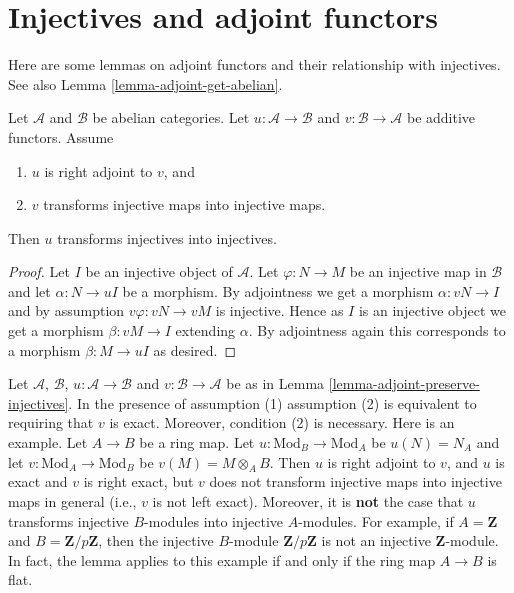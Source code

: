 \section{Injectives and adjoint functors}
\label{section-adjoint}

\noindent
Here are some lemmas on adjoint functors and their relationship with
injectives. See also Lemma \ref{lemma-adjoint-get-abelian}.

\begin{lemma}
\label{lemma-adjoint-preserve-injectives}
Let $\mathcal{A}$ and $\mathcal{B}$ be abelian categories.
Let $u : \mathcal{A} \to \mathcal{B}$ and
$v : \mathcal{B} \to \mathcal{A}$ be additive functors. Assume
\begin{enumerate}
\item $u$ is right adjoint to $v$, and
\item $v$ transforms injective maps into injective maps.
\end{enumerate}
Then $u$ transforms injectives into injectives.
\end{lemma}

\begin{proof}
Let $I$ be an injective object of $\mathcal{A}$.
Let $\varphi : N \to M$ be an injective map in $\mathcal{B}$ and let
$\alpha : N \to uI$ be a morphism.
By adjointness we get a morphism $\alpha : vN \to I$ and
by assumption $v\varphi : vN \to vM$ is injective.
Hence as $I$ is an injective object we get a morphism
$\beta : vM \to I$ extending $\alpha$. By adjointness
again this corresponds to a morphism $\beta : M \to uI$ as
desired.
\end{proof}

\begin{remark}
\label{remark-need-left-exactness}
Let $\mathcal{A}$, $\mathcal{B}$, $u : \mathcal{A} \to \mathcal{B}$ and
$v : \mathcal{B} \to \mathcal{A}$ be as in
Lemma \ref{lemma-adjoint-preserve-injectives}.
In the presence of assumption (1) assumption (2) is equivalent to requiring
that $v$ is exact. Moreover, condition (2) is necessary. Here is an example.
Let $A \to B$ be a ring map.
Let $u : \text{Mod}_B \to \text{Mod}_A$ be $u(N) = N_A$
and let $v : \text{Mod}_A \to \text{Mod}_B$ be
$v(M) = M \otimes_A B$. Then $u$ is right adjoint to $v$, and $u$ is
exact and $v$ is right exact, but $v$ does not transform injective maps into
injective maps in general (i.e., $v$ is not left exact).
Moreover, it is {\bf not} the case that $u$ transforms injective
$B$-modules into injective $A$-modules. For example, if
$A = \mathbf{Z}$ and $B = \mathbf{Z}/p\mathbf{Z}$, then
the injective $B$-module $\mathbf{Z}/p\mathbf{Z}$ is not
an injective $\mathbf{Z}$-module. In fact, the lemma applies to this
example if and only if the ring map $A \to B$ is flat.
\end{remark}

